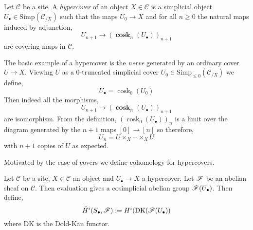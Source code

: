 \documentclass[12pt]{article}
\renewcommand{\C}{\mathcal{C}}
\newcommand{\DK}{\mathrm{DK}}
\renewcommand{\Cech}{\text{\v{C}ech}\xspace}
\newcommand{\Simp}{\mathrm{Simp}}
\DeclareMathOperator{\cosk}{\mathrm{cosk}}
\DeclareMathOperator{\bfcosk}{\mathbf{cosk}}
\begin{document}
\begin{defn}
Let $\C$ be a site. A \textit{hypercover} of an object $X \in \C$ is a simplicial object $U_\bullet \in \Simp(\C_{/X})$ such that the maps $U_0 \to X$ and for all $n \ge 0$ the natural maps induced by adjunction,
\[ U_{n+1} \to (\bfcosk_n(U_\bullet))_{n+1} \]
are covering maps in $\C$.
\end{defn}

\begin{example}
The basic example of a hypercover is the \textit{\Cech nerve} generated by an ordinary cover $U \to X$. Viewing $U$ as a $0$-truncated simplicial cover $U_0 \in \Simp_{\le 0}(\C_{/X})$ we define,
\[ U_\bullet = \cosk_0(U_0) \]
Then indeed all the morphisms,
\[ U_{n+1} \to (\bfcosk_{n}(U_\bullet))_{n+1} \]
are isomorphism. From the definition, $(\cosk_0(U_\bullet))_{n}$ is a limit over the diagram generated by the $n+1$ maps $[0] \to [n]$ so therefore,
\[ U_n = U \times_X \cdots \times_X U \]
with $n+1$ copies of $U$ as expected.  
\end{example}

Motivated by the case of \Cech covers we define \Cech cohomology for hypercovers.

\begin{defn}
Let $\C$ be a site, $X \in \C$ an object and $U_\bullet \to X$ a hypercover. Let $\mathscr{F}$ be an abelian sheaf on $\C$. Then evaluation gives a cosimplicial abelian group $\mathscr{F}(U_\bullet)$. Then define,
\[ \check{H}^i(S_\bullet, \F) := H^i(\DK(\F(U_\bullet)) \]
where $\DK$ is the Dold-Kan functor.
\end{defn}
\end{document}

